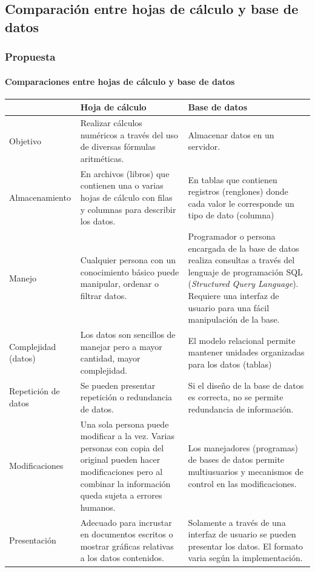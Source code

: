 \documentclass{beamer}
\begin{document}
\subsection{Comparación entre hojas de cálculo y base de datos}
\begin{frame}[shrink]
	\frametitle{Propuesta}
	\framesubtitle{Comparaciones entre hojas de cálculo y base de datos}
	
	\begin{center}
		\begin{tabular}{| l | p{6.5cm} | p{6.5cm} |}
			\hline
			 & Hoja de cálculo & Base de datos \\ \hline
			 
			 Objetivo 
			 	& Realizar cálculos numéricos a través del uso de diversas fórmulas aritméticas. 
			 	& Almacenar datos en un servidor. \\
			 \hline
			 Almacenamiento
			 	& En archivos (libros) que contienen una o varias hojas de cálculo con filas y columnas para describir los datos.
			 	& En tablas que contienen registros (renglones) donde cada valor le corresponde un tipo de dato (columna)\\
			 \hline
			 Manejo
			 	& Cualquier persona con un conocimiento básico puede manipular, ordenar o filtrar datos.
			 	& Programador o persona encargada de la base de datos realiza consultas a través del lenguaje de programación SQL (\textit{Structured Query Language}). Requiere una interfaz de usuario para una fácil manipulación de la base. \\
			 \hline
			 Complejidad (datos)
			 	& Los datos son sencillos de manejar pero a mayor cantidad, mayor complejidad.
			 	& El modelo relacional permite mantener unidades organizadas para los datos (tablas) \\
			 	\hline
			 Repetición de datos
			 	& Se pueden presentar repetición o redundancia de datos.
			 	& Si el diseño de la base de datos es correcta, no se permite redundancia de información. \\
			 	\hline
			 Modificaciones
			 	& Una sola persona puede modificar a la vez. Varias personas con copia del original pueden hacer modificaciones pero al combinar la información queda sujeta a errores humanos.
			 	& Los manejadores (programas) de bases de datos permite multiusuarios y mecanismos de control en las modificaciones. \\
			 	\hline
			 Presentación
			 	& Adecuado para incrustar en documentos escritos o mostrar gráficas relativas a los datos contenidos.
			 	& Solamente a través de una interfaz de usuario se pueden presentar los datos. El formato varia según la implementación. \\
			 	\hline
		\end{tabular}
	\end{center}
\end{frame}
\end{document}
